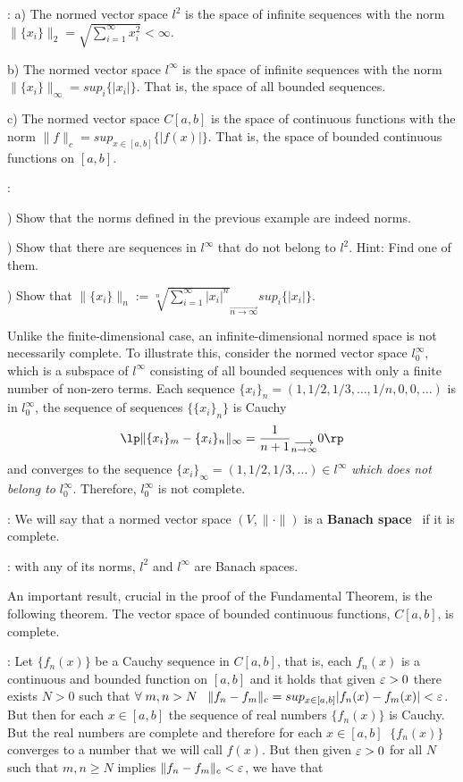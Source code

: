 \noi{}:
\noi 
a) The normed vector space $l^2$ is the space of
infinite sequences with the norm
$\|\{x_i\}\|_2=\sqrt{\sum_{i=1}^{\infty} x_i^2} < \infty $.

\noi 
b) The normed vector space $l^{\infty}$ is the space of
infinite sequences with the norm
$\|\{x_i\}\|_{\infty}=sup_{i}\{|x_i|\}$. That is, the space of all
bounded sequences.

\noi c) The normed vector space $C[a,b]$ is the space of
continuous functions with the norm $\|f\|_c=sup_{x\in [a,b]}\{|f(x)|\}$.
That is, the space of bounded continuous functions on $[a,b]$.

\espa
\noi{}:

) Show that the norms defined in the previous example are indeed norms.

) Show that there are sequences in $l^{\infty}$ that do not belong to
$l^2$. Hint: Find one of them.

) Show that $\|\{x_i\}\|_n := \sqrt[n]{\sum_{i=1}^{\infty} |x_i|^n}_{\stackrel{
\textstyle \longrightarrow}{\scriptstyle n \to \infty}} sup_i \{|x_i|\}$.
\espa

Unlike the finite-dimensional case, an infinite-dimensional normed space is not necessarily complete. To illustrate this, consider the normed vector space $l_0^{\infty}$, which is a subspace of $l^{\infty}$ consisting of all bounded sequences with only a finite number of non-zero terms. Each sequence $\{x_i\}_n= (1,1/2,1/3,\ldots,1/n,0,0,\ldots) $ is in
$l_0^{\infty}$, the sequence of sequences $\{\{x_i\}_n\}$ is Cauchy 
$$\lp \|\{x_i\}_{m}-\{x_i\}_n\|_{\infty}=\frac{1}{n+1}_{\stackrel{\textstyle\longrightarrow}
{\scriptstyle n\to\infty}} 0 \rp$$ 
and converges to the sequence $\{x_i\}_{\infty}=( 1,1/2,
1/3 ,\ldots)\in l^{\infty}$ {\it which does not belong to} $l_0^{\infty}$. Therefore,
$l_0^{\infty}$ is not complete.

\espa
{}: 
We will say that a normed vector space
$(V,\|\cdot\|)$ is a {\bf Banach space}~ if it is complete.

\noi
{}: 
\ren with any of its norms, $l^2$ and
$l^{\infty}$ are Banach spaces.
\espa

An important result, crucial in the proof of the Fundamental Theorem,
is the following theorem.
\bteo
The vector space of bounded continuous functions, $C[a,b]$, is complete.
\eteo

\pru: Let $\{f_n(x)\}$ be a Cauchy sequence in $C[a,b]$,
that is, each $f_n(x)$ is a continuous and bounded function on
$[a,b]$ and it holds that given $\mbox{$\varepsilon$}>0$ there exists $N>0$ such that
$\forall\;m,n>N\;\;\; \|f_n-f_m\|_c=sup_{x\in[a,b]}|f_n(x)-f_m(x)|<\mbox{$\varepsilon$}$.
But then for each $x\in[a,b]$ the sequence of real numbers
$\{f_n(x)\}$ is Cauchy. But the real numbers are complete and
therefore for each $x\in[a,b]\;\;\{f_n(x)\}$ converges to a
number that we will call $f(x)$. But then given $\mbox{$\varepsilon$}>0$ for
all $N$ such that $m,n\geq N$ implies $\|f_n-f_m\|_c<\mbox{$\varepsilon$}$, we have
that 

